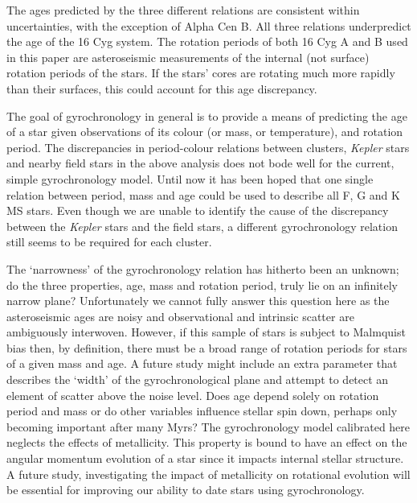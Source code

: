 \documentclass[useAMS, usenatbib]{mn2e}
\begin{document}
The ages predicted by the three different relations are consistent within
uncertainties, with the exception of Alpha Cen B.
All three relations underpredict the age of the 16 Cyg system.
The rotation periods of both 16 Cyg A and B used in this paper are
asteroseismic measurements of the internal (not surface) rotation periods
of the stars.
If the stars' cores are rotating much more rapidly than their surfaces, this
could account for this age discrepancy.

The goal of gyrochronology in general is to provide a means of predicting the
age of a star given observations of its colour (or mass, or temperature), and
rotation period.
The discrepancies in period-colour relations between clusters, {\it Kepler} stars
and nearby field stars in the above analysis does not bode well for the
current, simple gyrochronology model.
Until now it has been hoped that one single relation between period, mass and
age could be used to describe all F, G and K MS stars.
Even though we are unable to identify the cause of the discrepancy between the
{\it Kepler} stars and the field stars, a different gyrochronology relation still
seems to be required for each cluster.

The `narrowness' of the gyrochronology relation has hitherto been an unknown;
do the three properties, age, mass and rotation period, truly lie on an
infinitely narrow plane?
Unfortunately we cannot fully answer this question here as the asteroseismic
ages are noisy and observational and intrinsic scatter are ambiguously
interwoven.
However, if this sample of stars is subject to Malmquist bias then, by
definition, there must be a broad range of rotation periods for stars of a
given mass and age.
A future study might include an extra parameter that describes the `width' of
the gyrochronological plane and attempt to detect an element of scatter above
the noise level.
Does age depend solely on rotation period and mass or do other variables
influence stellar spin down, perhaps only becoming important after many Myrs?
The gyrochronology model calibrated here neglects the effects of metallicity.
This property is bound to have an effect on the angular momentum evolution
of a star since it impacts internal stellar structure.
A future study, investigating the impact of metallicity on rotational evolution
will be essential for improving our ability to date stars using gyrochronology.
\end{document}
